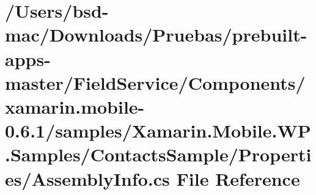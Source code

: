 \hypertarget{_components_2xamarin_8mobile-0_86_81_2samples_2_xamarin_8_mobile_8_w_p_8_samples_2_contacts_sampfd759af82ed26100b6bd44577f4367fc}{\section{/\+Users/bsd-\/mac/\+Downloads/\+Pruebas/prebuilt-\/apps-\/master/\+Field\+Service/\+Components/xamarin.mobile-\/0.6.1/samples/\+Xamarin.Mobile.\+W\+P.\+Samples/\+Contacts\+Sample/\+Properties/\+Assembly\+Info.cs File Reference}
\label{_components_2xamarin_8mobile-0_86_81_2samples_2_xamarin_8_mobile_8_w_p_8_samples_2_contacts_sampfd759af82ed26100b6bd44577f4367fc}
}
